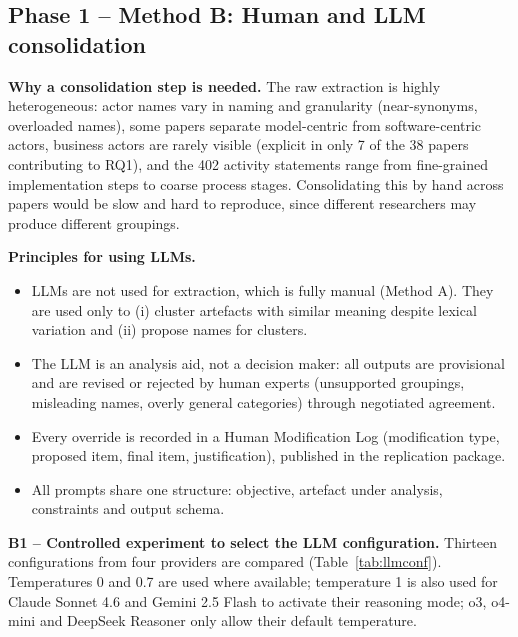 \documentclass[11pt,a4paper]{article}
\begin{document}
\subsection{Phase 1 -- Method B: Human and LLM consolidation}

\textbf{Why a consolidation step is needed.}
The raw extraction is highly heterogeneous: actor names vary in naming and granularity (near-synonyms, overloaded names), some papers separate model-centric from software-centric actors, business actors are rarely visible (explicit in only 7 of the 38 papers contributing to RQ1), and the 402 activity statements range from fine-grained implementation steps to coarse process stages. Consolidating this by hand across papers would be slow and hard to reproduce, since different researchers may produce different groupings.

\textbf{Principles for using LLMs.}
\begin{itemize}
  \item LLMs are not used for extraction, which is fully manual (Method A). They are used only to (i) cluster artefacts with similar meaning despite lexical variation and (ii) propose names for clusters.
  \item The LLM is an analysis aid, not a decision maker: all outputs are provisional and are revised or rejected by human experts (unsupported groupings, misleading names, overly general categories) through negotiated agreement.
  \item Every override is recorded in a Human Modification Log (modification type, proposed item, final item, justification), published in the replication package.
  \item All prompts share one structure: objective, artefact under analysis, constraints and output schema.
\end{itemize}

\textbf{B1 -- Controlled experiment to select the LLM configuration.}
Thirteen configurations from four providers are compared (Table~\ref{tab:llmconf}). Temperatures 0 and 0.7 are used where available; temperature 1 is also used for Claude Sonnet 4.6 and Gemini 2.5 Flash to activate their reasoning mode; o3, o4-mini and DeepSeek Reasoner only allow their default temperature.
\end{document}
